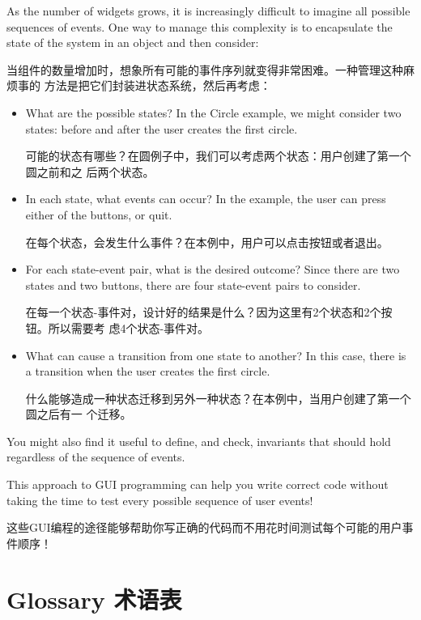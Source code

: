 \documentclass[10pt]{book}
\begin{document}
\begin{CJK}{UTF8}{gbsn}
As the number of widgets grows, it is increasingly difficult to
imagine all possible sequences of events.  One way to manage this 
complexity is to encapsulate the state of the system in an object
and then consider:

当组件的数量增加时，想象所有可能的事件序列就变得非常困难。一种管理这种麻烦事的
方法是把它们封装进状态系统，然后再考虑：

\begin{itemize}

\item What are the possible states?  In the Circle example, we
might consider two states: before and after the user creates the
first circle.

可能的状态有哪些？在圆例子中，我们可以考虑两个状态：用户创建了第一个圆之前和之
后两个状态。

\item In each state, what events can occur?  In the example,
the user can press either of the buttons, or quit.

在每个状态，会发生什么事件？在本例中，用户可以点击按钮或者退出。

\item For each state-event pair, what is the desired outcome?
Since there are two states and two buttons, there are four
state-event pairs to consider.

在每一个状态-事件对，设计好的结果是什么？因为这里有2个状态和2个按钮。所以需要考
虑4个状态-事件对。

\item What can cause a transition from one state to another?
In this case, there is a transition when the user creates
the first circle.

什么能够造成一种状态迁移到另外一种状态？在本例中，当用户创建了第一个圆之后有一
个迁移。

\end{itemize}

You might also find it useful to define, and check, invariants that
should hold regardless of the sequence of events.


This approach to GUI programming can help you write correct
code without taking the time to test every possible sequence
of user events!

这些GUI编程的途径能够帮助你写正确的代码而不用花时间测试每个可能的用户事件顺序！


\section{Glossary 术语表}


\end{CJK}
\end{document}
